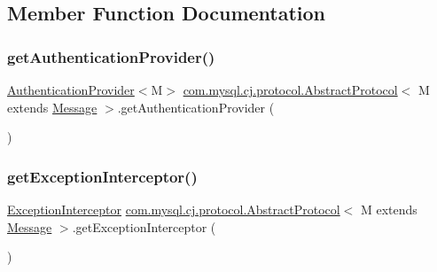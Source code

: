 \subsection{Member Function Documentation}
\mbox{\label{classcom_1_1mysql_1_1cj_1_1protocol_1_1_abstract_protocol_ad65b18b49a9f5c11968f0a5eddb54b75}} 
\subsubsection{\texorpdfstring{get\+Authentication\+Provider()}{getAuthenticationProvider()}}
{\footnotesize\ttfamily \mbox{\hyperlink{interfacecom_1_1mysql_1_1cj_1_1protocol_1_1_authentication_provider}{Authentication\+Provider}}$<$M$>$ \mbox{\hyperlink{classcom_1_1mysql_1_1cj_1_1protocol_1_1_abstract_protocol}{com.\+mysql.\+cj.\+protocol.\+Abstract\+Protocol}}$<$ M extends \mbox{\hyperlink{interfacecom_1_1mysql_1_1cj_1_1protocol_1_1_message}{Message}} $>$.get\+Authentication\+Provider (\begin{DoxyParamCaption}{ }\end{DoxyParamCaption})}

\mbox{\label{classcom_1_1mysql_1_1cj_1_1protocol_1_1_abstract_protocol_a2ff358e0164a46cca88e99033bccfe41}} 
\subsubsection{\texorpdfstring{get\+Exception\+Interceptor()}{getExceptionInterceptor()}}
{\footnotesize\ttfamily \mbox{\hyperlink{interfacecom_1_1mysql_1_1cj_1_1exceptions_1_1_exception_interceptor}{Exception\+Interceptor}} \mbox{\hyperlink{classcom_1_1mysql_1_1cj_1_1protocol_1_1_abstract_protocol}{com.\+mysql.\+cj.\+protocol.\+Abstract\+Protocol}}$<$ M extends \mbox{\hyperlink{interfacecom_1_1mysql_1_1cj_1_1protocol_1_1_message}{Message}} $>$.get\+Exception\+Interceptor (\begin{DoxyParamCaption}{ }\end{DoxyParamCaption})}

